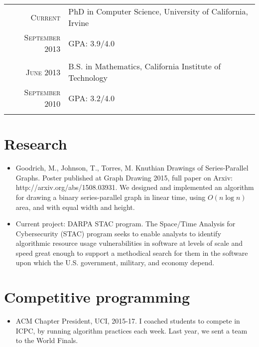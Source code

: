 \documentclass[a4paper,10pt]{article} %
\begin{document}
\begin{tabular}{r|l}	
\textsc{Current} & PhD in Computer Science, University of California, Irvine\\
\textsc{September 2013} &\normalsize \textsc{GPA}: 3.9/4.0 \\
\multicolumn{2}{c}{} \\


\textsc{June 2013} & B.S. in Mathematics, California Institute of Technology \\
\textsc{September 2010} &\normalsize \textsc{GPA}: 3.2/4.0 \\
\multicolumn{2}{c}{} \\

\end{tabular}

\section{Research}
\begin{itemize}
\item Goodrich, M., Johnson, T., Torres, M. Knuthian Drawings of Series-Parallel Graphs. Poster published at Graph Drawing 2015, full paper on Arxiv: http://arxiv.org/abs/1508.03931. \newline
We designed and implemented an algorithm for drawing a binary series-parallel graph in linear time, using $O(n \log n)$ area, and with equal width and height.

\item Current project: DARPA STAC program. The Space/Time Analysis for Cybersecurity (STAC) program seeks to enable analysts to identify algorithmic resource usage vulnerabilities in software at levels of scale and speed great enough to support a methodical search for them in the software upon which the U.S. government, military, and economy depend.
\end{itemize}

\section{Competitive programming}

\begin{itemize}
\item ACM Chapter President, UCI, 2015-17. I coached students to compete in ICPC, by running algorithm practices each week. Last year, we sent a team to the World Finals.
\end{itemize}
\end{document}
